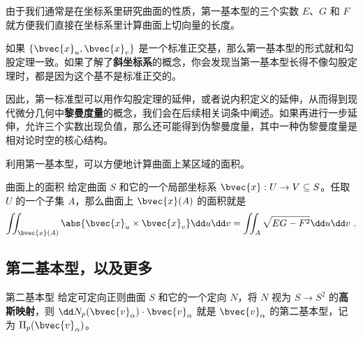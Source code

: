 由于我们通常是在坐标系里研究曲面的性质，第一基本型的三个实数 $E$、$G$ 和 $F$ 就方便我们直接在坐标系里计算曲面上切向量的长度。

如果 $\{\bvec{x}_u, \bvec{x}_v\}$ 是一个标准正交基，那么第一基本型的形式就和勾股定理一致。如果了解了\textbf{斜坐标系}的概念，你会发现当第一基本型长得不像勾股定理时，都是因为这个基不是标准正交的。

因此，第一标准型可以用作勾股定理的延伸，或者说内积定义的延伸，从而得到现代微分几何中\textbf{黎曼度量}的概念，我们会在后续相关词条中阐述。如果再进行一步延伸，允许三个实数出现负值，那么还可能得到伪黎曼度量，其中一种伪黎曼度量是相对论时空的核心结构。

利用第一基本型，可以方便地计算曲面上某区域的面积。

\begin{theorem}{曲面上的面积}
给定曲面 $S$ 和它的一个局部坐标系 $\bvec{x}:U\to V\subseteq S$。任取 $U$ 的一个子集 $A$，那么曲面上 $\bvec{x}(A)$ 的面积就是
\begin{equation}
\iint_{\bvec{x}(A)}\abs{\bvec{x}_u\times\bvec{x}_v}\dd u\dd v=\iint_{A}\sqrt{EG-F^2} \dd u\dd v~.
\end{equation}
\end{theorem}


\subsection{第二基本型，以及更多}
\begin{definition}{第二基本型}
给定可定向正则曲面 $S$ 和它的一个定向 $N$，将 $N$ 视为 $S\to S^2$ 的\textbf{高斯映射}，则 $\dd N_p(\bvec{v}_\alpha)\cdot \bvec{v}_\alpha$ 就是 $\bvec{v}_\alpha$ 的第二基本型，记为 $\mathrm{II}_p(\bvec{v}_\alpha)$。
\end{definition}
